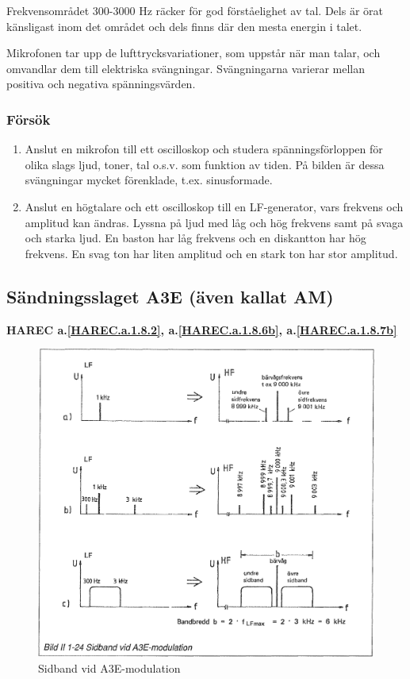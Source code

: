 Frekvensområdet 300-3000 Hz räcker för god förståelighet av tal. Dels är örat
känsligast inom det området och dels finns där den mesta energin i talet.

Mikrofonen tar upp de lufttrycksvariationer, som uppstår när man talar, och
omvandlar dem till elektriska svängningar. Svängningarna varierar mellan
positiva och negativa spänningsvärden.

\subsubsection{Försök}

\begin{enumerate}
\item Anslut en mikrofon till ett oscilloskop och studera spänningsförloppen
för olika slags ljud, toner, tal o.s.v. som funktion av tiden. På bilden är
dessa svängningar mycket förenklade, t.ex. sinusformade.

\item Anslut en högtalare och ett oscilloskop till en LF-generator, vars
frekvens och amplitud kan ändras. Lyssna på ljud med låg och hög frekvens samt
på svaga och starka ljud. En baston har låg frekvens och en diskantton har hög
frekvens. En svag ton har liten amplitud och en stark ton har stor amplitud.
\end{enumerate}

\subsection{Sändningsslaget A3E (även kallat AM)}
\textbf{HAREC a.\ref{HAREC.a.1.8.2}, a.\ref{HAREC.a.1.8.6b}, a.\ref{HAREC.a.1.8.7b}\label{myHAREC.a.1.8.2}\label{myHAREC.a.1.8.6b}\label{myHAREC.a.1.8.7b}}

\begin{figure}
\includegraphics[width=\textwidth]{images/bild_2_1-24}
\caption{Sidband vid A3E-modulation}
\label{fig:BildII1-24}
\end{figure}

